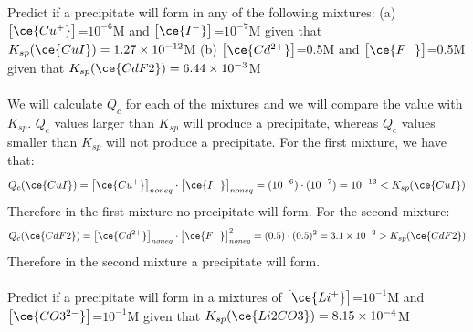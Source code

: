 \documentclass[main.tex]{subfiles}
\begin{document}
\begin{description}
\begin{example} %
Predict if a precipitate will form in any of the following mixtures: (a) $\big[ \ce{Cu^{+}} \big]$=$10^{-6}$M and $\big[ \ce{I^{-}} \big]$=$10^{-7}$M given that $K_{sp}(\ce{CuI})=1.27\times10^{-12}$M (b) $\big[ \ce{Cd^{2+}} \big]$=0.5M and $\big[ \ce{F^{-}} \big]$=0.5M given that $K_{sp}(\ce{CdF2})=6.44\times10^{-3}$M\\
\\
We will calculate $Q_c$ for each of the mixtures and we will compare the value with $K_{sp}$. $Q_c$ values larger than $K_{sp}$ will produce a precipitate, whereas $Q_c$ values smaller than $K_{sp}$ will not produce a precipitate. For the first mixture, we have that:
\[ Q_{c}(\ce{CuI})= \big[ \ce{Cu^{+}} \big]_{noneq}\cdot \big[ \ce{I^{-}} \big]_{noneq}=(10^{-6})\cdot (10^{-7})=10^{-13} < K_{sp}(\ce{CuI})\]
Therefore in the first mixture no precipitate will form. For the second mixture:
\[ Q_{c}(\ce{CdF2})= \big[ \ce{Cd^{2+}} \big]_{noneq}\cdot \big[ \ce{F^{-}} \big]^2_{noneq}=(0.5)\cdot (0.5)^2=3.1\times 10^{-2} >K_{sp}(\ce{CdF2})\]
Therefore in the second mixture a precipitate will form. \\
\faDiamond\ \\
Predict if a precipitate will form in a mixtures of $\big[ \ce{Li^{+}} \big]$=$10^{-1}$M and $\big[ \ce{CO3^{2-}} \big]$=$10^{-1}$M given that $K_{sp}(\ce{Li2CO3})=8.15\times10^{-4}$M\\
\end{example}%



\end{description}
\end{document}
